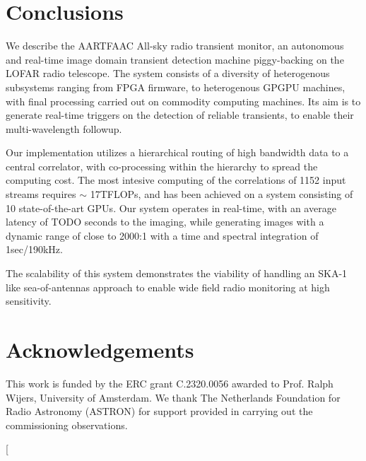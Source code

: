 \documentclass{ws-jai}
\begin{document}
\section {\label{sec:conclusion} Conclusions}
We  describe the  AARTFAAC All-sky  radio transient  monitor, an  autonomous and
real-time image  domain transient detection  machine piggy-backing on  the LOFAR
radio telescope. The  system consists of a diversity  of heterogenous subsystems
ranging  from  FPGA  firmware,  to   heterogenous  GPGPU  machines,  with  final
processing carried out on commodity computing  machines.  Its aim is to generate
real-time  triggers on  the detection  of reliable  transients, to  enable their
multi-wavelength followup.

Our implementation utilizes  a hierarchical routing of high bandwidth  data to a
central  correlator,  with co-processing  within  the  hierarchy to  spread  the
computing cost.  The most intesive computing  of the correlations of  1152 input
streams requires $\sim$ 17TFLOPs, and has  been achieved on a system consisting of
10  state-of-the-art GPUs.  Our system  operates in  real-time, with  an average
latency of TODO  seconds to the imaging, while generating  images with a dynamic
range of close to 2000:1 with a time and spectral integration of 1sec/190kHz.

The scalability of  this system demonstrates the viability of  handling an SKA-1
like  sea-of-antennas approach  to enable  wide field  radio monitoring  at high
sensitivity.

\section* {Acknowledgements}
This work is funded by the ERC grant C.2320.0056 awarded to Prof.  Ralph Wijers,
University  of Amsterdam. We  thank The  Netherlands  Foundation for  Radio
Astronomy  (ASTRON)  for support  provided  in  carrying out  the  commissioning
observations.

[

\end{document}
